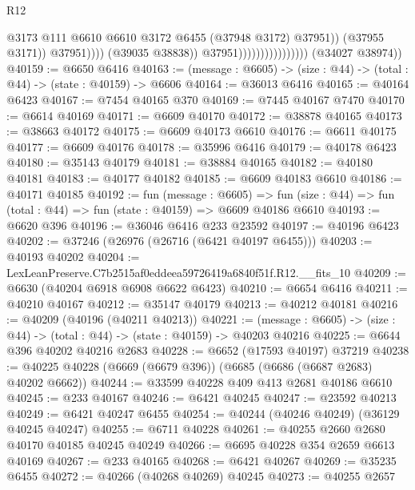 \begin{lexlean}{R12}
\begin{coremodule}
                                                      @3173
                                                      @111
                                                      @6610
                                                      @6610
                                                      @3172
                                                      @6455
                                                      (@37948 @3172)
                                                      @37951))
                                                  (@37955 @3171))
                                                @37951))))
                                        (@39035 @38838))
                                      @37951))))))))))))))))
      (@34027 @38974))
@40159 := @6650 @6416
@40163 := (message : @6605) -> (size : @44) -> (total : @44) -> (state : @40159) -> @6606
@40164 := @36013 @6416
@40165 := @40164 @6423
@40167 := @7454 @40165 @370
@40169 := @7445 @40167 @7470
@40170 := @6614 @40169
@40171 := @6609 @40170
@40172 := @38878 @40165
@40173 := @38663 @40172
@40175 := @6609 @40173 @6610
@40176 := @6611 @40175
@40177 := @6609 @40176
@40178 := @35996 @6416
@40179 := @40178 @6423
@40180 := @35143 @40179
@40181 := @38884 @40165
@40182 := @40180 @40181
@40183 := @40177 @40182
@40185 := @6609 @40183 @6610
@40186 := @40171 @40185
@40192 := fun (message : @6605) =>
  fun (size : @44) => fun (total : @44) => fun (state : @40159) => @6609 @40186 @6610
@40193 := @6620 @396
@40196 := @36046 @6416 @233 @23592
@40197 := @40196 @6423
@40202 := @37246 (@26976 (@26716 (@6421 @40197 @6455)))
@40203 := @40193 @40202
@40204 := LexLeanPreserve.C7b2515af0eddeea59726419a6840f51f.R12.__fits_10
@40209 := @6630 (@40204 @6918 @6908 @6622 @6423)
@40210 := @6654 @6416
@40211 := @40210 @40167
@40212 := @35147 @40179
@40213 := @40212 @40181
@40216 := @40209 (@40196 (@40211 @40213))
@40221 := (message : @6605) -> (size : @44) -> (total : @44) -> (state : @40159) -> @40203 @40216
@40225 := @6644 @396 @40202 @40216 @2683
@40228 := @6652 (@17593 @40197) @37219
@40238 := @40225 @40228 (@6669 (@6679 @396)) (@6685 (@6686 (@6687 @2683) @40202 @6662))
@40244 := @33599 @40228 @409 @413 @2681 @40186 @6610
@40245 := @233 @40167
@40246 := @6421 @40245
@40247 := @23592 @40213
@40249 := @6421 @40247 @6455
@40254 := @40244 (@40246 @40249) (@36129 @40245 @40247)
@40255 := @6711 @40228
@40261 := @40255 @2660 @2680 @40170 @40185 @40245 @40249
@40266 := @6695 @40228 @354 @2659 @6613 @40169
@40267 := @233 @40165
@40268 := @6421 @40267
@40269 := @35235 @6455
@40272 := @40266 (@40268 @40269) @40245
@40273 := @40255 @2657

\end{coremodule}
\end{lexlean}
